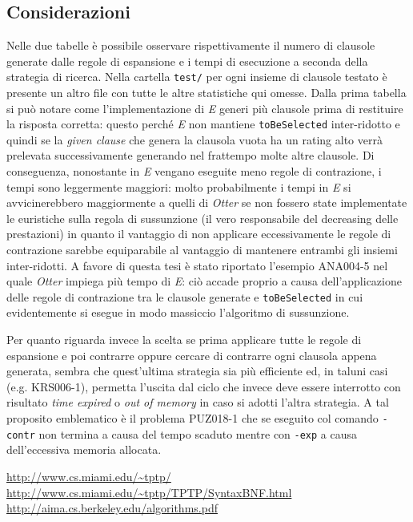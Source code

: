 \documentclass[a4paper,11pt]{article}
\makeatletter
\let\@orig@endthebibliography\endthebibliography
\renewcommand\endthebibliography{
\xdef\@kept@last@number{\the\c@enumiv}
\@orig@endthebibliography}
\newenvironment{thesitography}[1]
{\def\refname{Siti consultati}%
\thebibliography{#1}%
\setcounter{enumiv}{\@kept@last@number}%
}
	{\@orig@endthebibliography}
\makeatother
\begin{document}
\subsection{Considerazioni}
Nelle due tabelle è possibile osservare rispettivamente il numero di clausole generate dalle regole di espansione e i tempi di esecuzione a seconda della strategia di ricerca. Nella cartella \texttt{test/} per ogni insieme di clausole testato è presente un altro file con tutte le altre statistiche qui omesse.
Dalla prima tabella si può notare come l'implementazione di \emph{E} generi più clausole prima di restituire la risposta corretta: questo perché \emph{E} non mantiene \texttt{toBeSelected} inter-ridotto e quindi se la \emph{given clause} che genera la clausola vuota ha un rating alto verrà prelevata successivamente generando nel frattempo molte altre clausole. Di conseguenza, nonostante in \emph{E} vengano eseguite meno regole di contrazione, i tempi sono leggermente maggiori: molto probabilmente i tempi in \emph{E} si avvicinerebbero maggiormente a quelli di \emph{Otter} se non fossero state implementate le euristiche sulla regola di sussunzione (il vero responsabile del decreasing delle prestazioni) in quanto il vantaggio di non applicare eccessivamente le regole di contrazione sarebbe equiparabile al vantaggio di mantenere entrambi gli insiemi inter-ridotti. A favore di questa tesi è stato riportato l'esempio ANA004-5 nel quale \emph{Otter} impiega più tempo di \emph{E}: ciò accade proprio a causa dell'applicazione delle regole di contrazione tra le clausole generate e \texttt{toBeSelected} in cui evidentemente si esegue in modo massiccio l'algoritmo di sussunzione.\par
Per quanto riguarda invece la scelta se prima applicare tutte le regole di espansione e poi contrarre oppure cercare di contrarre ogni clausola appena generata, sembra che quest'ultima strategia sia più efficiente ed, in taluni casi (e.g. KRS006-1), permetta l'uscita dal ciclo che invece deve essere interrotto con risultato \emph{time expired} o \emph{out of memory} in caso si adotti l'altra strategia. A tal proposito emblematico è il problema PUZ018-1 che se eseguito col comando \texttt{-contr} non termina a causa del tempo scaduto mentre con \texttt{-exp} a causa dell'eccessiva memoria allocata.

\begin{thesitography}{9}
\url{http://www.cs.miami.edu/~tptp/}
\url{http://www.cs.miami.edu/~tptp/TPTP/SyntaxBNF.html}		
\url{http://aima.cs.berkeley.edu/algorithms.pdf}
\end{thesitography}
\end{document}
